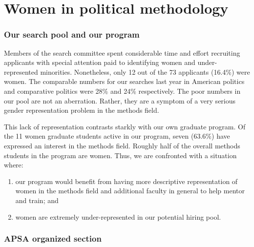 \documentclass[12pt]{texMemo}
\begin{document}
\section*{Women in political methodology}

\subsubsection*{Our search pool and our program}

Members of the search committee spent considerable time and effort recruiting applicants with special attention paid to identifying women and under-represented minorities.  Nonetheless, only 12 out of the 73 applicants (16.4\%) were women.  The comparable numbers for our searches last year in American politics and comparative politics were  28\% and  24\% respectively. The poor numbers in our pool are not an aberration.  Rather, they are a symptom of a very serious gender representation problem in the methods field.  

This lack of representation contrasts starkly with our own graduate program. Of the 11 women graduate students active in our program, seven (63.6\%) have expressed an interest in the methods field.  Roughly half of the overall methods students in the program are women.  Thus, we are confronted with a situation where:\setlength\itemsep{0em}
\begin{enumerate}
\item our program would benefit from having more descriptive representation of women in the methods field and additional faculty in general to help mentor and train; and
\item women are extremely under-represented in our potential hiring pool.
\end{enumerate}



\subsubsection*{APSA organized section}
\end{document}
